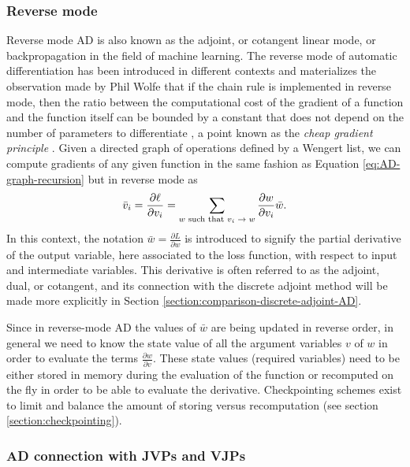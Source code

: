 \subsubsection{Reverse mode}

Reverse mode AD is also known as the adjoint, or cotangent linear mode, or backpropagation in the field of machine learning. 
The reverse mode of automatic differentiation has been introduced in different contexts \cite{griewank2012invented} and materializes the observation made by Phil Wolfe that if the chain rule is implemented in reverse mode, then the ratio between the computational cost of the gradient of a function and the function itself can be bounded by a constant that does not depend on the number of parameters to differentiate \cite{Griewank_1989, Wolfe_1982}, a point known as the \textit{cheap gradient principle} \cite{griewank2012invented}.  
Given a directed graph of operations defined by a Wengert list, we can compute gradients of any given function in the same fashion as Equation \eqref{eq:AD-graph-recursion} but in reverse mode as
\begin{equation}
    \bar v_i 
    = 
    \frac{\partial \ell}{\partial v_i}
    = 
    \sum_\text{$w$\text{ such that} $v_i \rightarrow w$}
    \frac{\partial w}{\partial v_i} \bar{w}.
    \label{eq:reverse-mode-ad-definition}
\end{equation}
In this context, the notation $\bar{w} = \frac{\partial L}{\partial w}$ is introduced to signify the partial derivative of the output variable, here associated to the loss function, with respect to input and intermediate variables. 
This derivative is often referred to as the adjoint, dual, or cotangent, and its connection with the discrete adjoint method will be made more explicitly in Section \ref{section:comparison-discrete-adjoint-AD}. 

Since in reverse-mode AD the values of $\bar w$ are being updated in reverse order, in general
we need to know the state value of all the argument variables $v$ of $w$ in order to evaluate the terms $\frac{\partial w}{\partial v}$.
These state values (required variables) need to be either stored in memory during the evaluation of the function or recomputed on the fly in order to be able to evaluate the derivative. 
Checkpointing schemes exist to limit and balance the amount of storing versus recomputation (see section \ref{section:checkpointing}).


\subsubsection{AD connection with JVPs and VJPs}
\label{sec:vjp-jvp}

